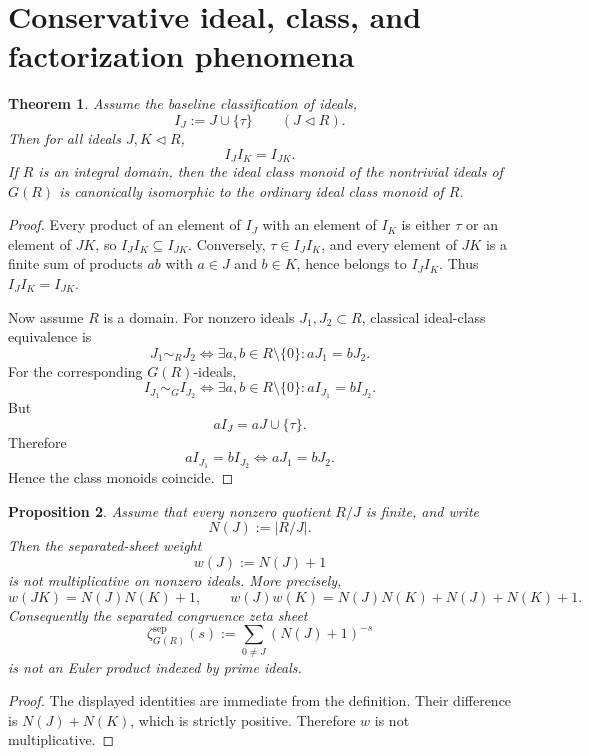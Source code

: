 \documentclass[11pt]{amsart}
\numberwithin{equation}{section}
\newtheorem{theorem}{Theorem}[section]
\newtheorem{proposition}[theorem]{Proposition}
\theoremstyle{definition}
\begin{document}
\section{Conservative ideal, class, and factorization phenomena}

\begin{theorem}\label{thm:ideal-multiplication-classical}
Assume the baseline classification of ideals,
\[
I_J:=J\cup\{\tau\}
\qquad(J\triangleleft R).
\]
Then for all ideals $J,K\triangleleft R$,
\[
I_JI_K=I_{JK}.
\]
If $R$ is an integral domain, then the ideal class monoid of the nontrivial ideals of $G(R)$ is canonically isomorphic to the ordinary ideal class monoid of $R$.
\end{theorem}

\begin{proof}
Every product of an element of $I_J$ with an element of $I_K$ is either $\tau$ or an element of $JK$, so $I_JI_K\subseteq I_{JK}$. Conversely, $\tau\in I_JI_K$, and every element of $JK$ is a finite sum of products $ab$ with $a\in J$ and $b\in K$, hence belongs to $I_JI_K$. Thus $I_JI_K=I_{JK}$.

Now assume $R$ is a domain. For nonzero ideals $J_1,J_2\subset R$, classical ideal-class equivalence is
\[
J_1\sim_R J_2
\iff
\exists a,b\in R\setminus\{0\}:aJ_1=bJ_2.
\]
For the corresponding $G(R)$-ideals,
\[
I_{J_1}\sim_G I_{J_2}
\iff
\exists a,b\in R\setminus\{0\}:aI_{J_1}=bI_{J_2}.
\]
But
\[
aI_J=aJ\cup\{\tau\}.
\]
Therefore
\[
aI_{J_1}=bI_{J_2}
\iff
aJ_1=bJ_2.
\]
Hence the class monoids coincide. 
\end{proof}

\begin{proposition}\label{prop:separated-weight-nonmultiplicative}
Assume that every nonzero quotient $R/J$ is finite, and write
\[
N(J):=|R/J|.
\]
Then the separated-sheet weight
\[
w(J):=N(J)+1
\]
is not multiplicative on nonzero ideals. More precisely,
\[
w(JK)=N(J)N(K)+1,
\qquad
w(J)w(K)=N(J)N(K)+N(J)+N(K)+1.
\]
Consequently the separated congruence zeta sheet
\[
\zeta^{\mathrm{sep}}_{G(R)}(s):=\sum_{0\neq J}(N(J)+1)^{-s}
\]
is not an Euler product indexed by prime ideals.
\end{proposition}

\begin{proof}
The displayed identities are immediate from the definition. Their difference is $N(J)+N(K)$, which is strictly positive. Therefore $w$ is not multiplicative. 
\end{proof}
\end{document}
